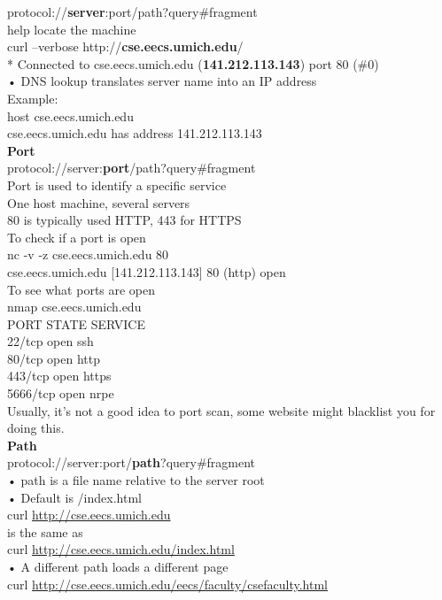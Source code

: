 \documentclass{article}
\begin{document}
protocol://\textbf{server}:port/path?query#fragment\\
help locate the machine\\
 curl --verbose http://\textbf{cse.eecs.umich.edu}/ \\
* Connected to cse.eecs.umich.edu (\textbf{141.212.113.143}) port 80 (\#0)\\
• DNS lookup translates server name into an IP address \\
Example: \\
host cse.eecs.umich.edu\\
cse.eecs.umich.edu has address 141.212.113.143 \\
\textbf{Port}\\
protocol://server:\textbf{port}/path?query#fragment\\
Port is used to identify a specific service\\
One host machine, several servers\\
80 is typically used HTTP, 443 for HTTPS\\
To check if a port is open\\
nc -v -z cse.eecs.umich.edu 80 \\
cse.eecs.umich.edu [141.212.113.143] 80 (http) open\\
To see what ports are open\\
nmap cse.eecs.umich.edu\\
PORT STATE SERVICE \\
22/tcp open ssh \\
80/tcp open http \\
443/tcp open https\\
5666/tcp open nrpe \\
Usually, it's not a good idea to port scan, some website might blacklist you for doing this.\\
\textbf{Path}\\
protocol://server:port/\textbf{path}?query#fragment\\
• path is a file name relative to the server root \\
• Default is /index.html \\
curl \url{http://cse.eecs.umich.edu} \\
is the same as\\
curl \url{http://cse.eecs.umich.edu/index.html}\\
• A different path loads a different page\\
curl \url{http://cse.eecs.umich.edu/eecs/faculty/csefaculty.html}\\
\end{document}
